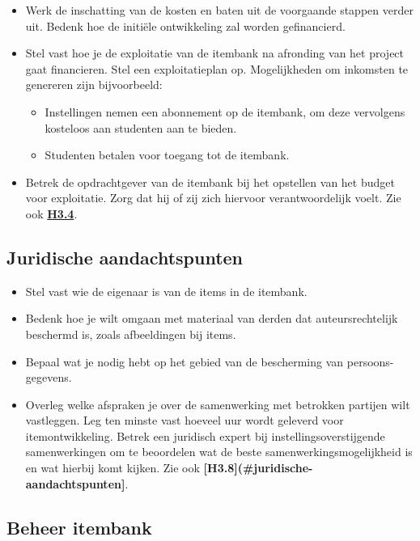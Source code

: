 \documentclass[
]{book}
\providecommand{\tightlist}{%
  \setlength{\itemsep}{0pt}\setlength{\parskip}{0pt}}
\begin{document}
\begin{itemize}
\tightlist
\item
  Werk de inschatting van de kosten en baten uit de voorgaande stappen verder uit. Bedenk hoe de initiële ontwikkeling zal worden gefinancierd.
\item
  Stel vast hoe je de exploitatie van de itembank na afronding van het project gaat financieren. Stel een exploitatieplan op. Mogelijkheden om inkomsten te genereren zijn bijvoorbeeld:

  \begin{itemize}
  \tightlist
  \item
    Instellingen nemen een abonnement op de itembank, om deze vervolgens kosteloos aan studenten aan te bieden.
  \item
    Studenten betalen voor toegang tot de itembank.
  \end{itemize}
\item
  Betrek de opdrachtgever van de itembank bij het opstellen van het budget voor exploitatie. Zorg dat hij of zij zich hiervoor verantwoordelijk voelt. Zie ook \textbf{\protect\hyperlink{kosten-en-baten}{H3.4}}.
\end{itemize}

\hypertarget{juridische-aandachtspunten}{%
\subsection{Juridische aandachtspunten}\label{juridische-aandachtspunten}}

\begin{itemize}
\tightlist
\item
  Stel vast wie de eigenaar is van de items in de itembank.
\item
  Bedenk hoe je wilt omgaan met materiaal van derden dat auteursrechtelijk beschermd is, zoals afbeeldingen bij items.
\item
  Bepaal wat je nodig hebt op het gebied van de bescherming van persoons- gegevens.
\item
  Overleg welke afspraken je over de samenwerking met betrokken partijen wilt vastleggen. Leg ten minste vast hoeveel uur wordt geleverd voor itemontwikkeling. Betrek een juridisch expert bij instellingsoverstijgende samenwerkingen om te beoordelen wat de beste samenwerkingsmogelijkheid is en wat hierbij komt kijken. Zie ook \textbf{{[}H3.8{]}(\#juridische-aandachtspunten{]}}.
\end{itemize}

\hypertarget{beheer-itembank}{%
\subsection{Beheer itembank}\label{beheer-itembank}}
\end{document}
